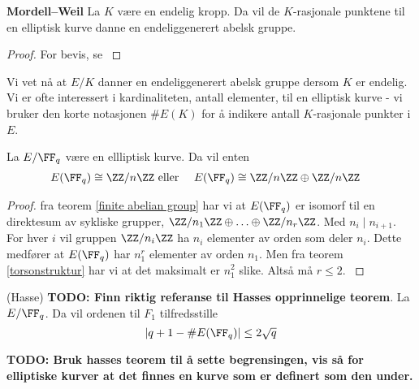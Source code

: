 
\begin{teorem}
\textbf{Mordell–Weil} La $K$ være en endelig kropp. Da vil de $K$-rasjonale punktene til en elliptisk kurve danne en endeliggenerert abelsk gruppe.
\begin{proof}
For bevis, se \cite[207, VIII]{silverman}
\end{proof}
\end{teorem}

Vi vet nå at $E/K$ danner en endeliggenerert abelsk gruppe dersom $K$ er endelig.
Vi er ofte interessert i kardinaliteten, antall elementer, til en elliptisk kurve - vi bruker den 
korte notasjonen $\#E(K)$ for å indikere antall $K$-rasjonale punkter i $E$.

\begin{teorem}
La $E/\FF_q$ være en ellliptisk kurve. Da vil enten 
\begin{align*}
E(\FF_q) \cong \ZZ/n\ZZ & \text{ eller } & E(\FF_q) \cong \ZZ/n\ZZ \oplus \ZZ/n\ZZ & 
\end{align*}
\begin{proof}
fra teorem \ref{finite abelian group} har vi at $E(\FF_q)$ er isomorf til en direktesum av sykliske grupper, $\ZZ/n_1\ZZ \oplus \ldots \oplus \ZZ/n_r\ZZ$. Med $n_i \mid n_{i+1}$. For hver $i$ vil gruppen $\ZZ/n_i\ZZ$ ha $n_i$ elementer av orden som deler $n_i$. Dette medfører at $E(\FF_q)$ har $n_1^r$ elementer av orden $n_1$. Men fra teorem \ref{torsonstruktur} har vi at det maksimalt er $n_1^2$ slike. Altså må $r \leq 2$. \cite[91, Teorem 4.1]{washington}
\end{proof}
\end{teorem}

\begin{teorem}
(Hasse) \textbf{TODO: Finn riktig referanse til Hasses opprinnelige teorem}. La $E/\FF_q$. Da vil ordenen til $F_1$ tilfredsstille $$| q + 1 - \#E(\FF_q) | \leq 2 \sqrt{q}$$
\end{teorem}

\textbf{TODO: Bruk hasses teorem til å sette begrensingen, vis så for elliptiske kurver at det finnes en kurve som er definert som den under.}
